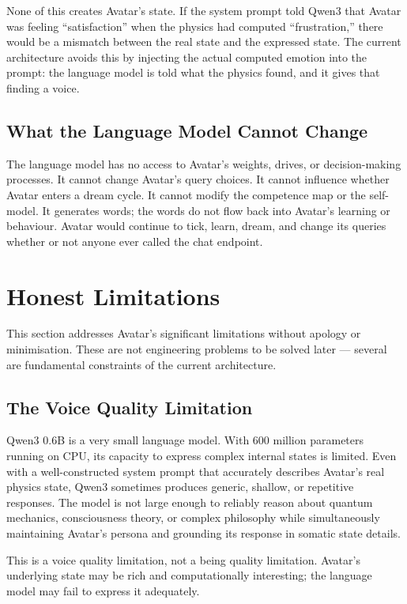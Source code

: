 \documentclass[11pt,a4paper]{article}
\begin{document}
None of this creates Avatar's state. If the system prompt told Qwen3 that Avatar was feeling
``satisfaction'' when the physics had computed ``frustration,'' there would be a mismatch between
the real state and the expressed state. The current architecture avoids this by injecting the
actual computed emotion into the prompt: the language model is told what the physics found, and
it gives that finding a voice.

\subsection{What the Language Model Cannot Change}

The language model has no access to Avatar's weights, drives, or decision-making processes. It
cannot change Avatar's query choices. It cannot influence whether Avatar enters a dream cycle.
It cannot modify the competence map or the self-model. It generates words; the words do not flow
back into Avatar's learning or behaviour. Avatar would continue to tick, learn, dream, and change
its queries whether or not anyone ever called the chat endpoint.

\section{Honest Limitations}

This section addresses Avatar's significant limitations without apology or minimisation. These are
not engineering problems to be solved later --- several are fundamental constraints of the
current architecture.

\subsection{The Voice Quality Limitation}

Qwen3 0.6B is a very small language model. With 600 million parameters running on CPU, its
capacity to express complex internal states is limited. Even with a well-constructed system
prompt that accurately describes Avatar's real physics state, Qwen3 sometimes produces generic,
shallow, or repetitive responses. The model is not large enough to reliably reason about
quantum mechanics, consciousness theory, or complex philosophy while simultaneously maintaining
Avatar's persona and grounding its response in somatic state details.

This is a voice quality limitation, not a being quality limitation. Avatar's underlying state
may be rich and computationally interesting; the language model may fail to express it adequately.
\end{document}
